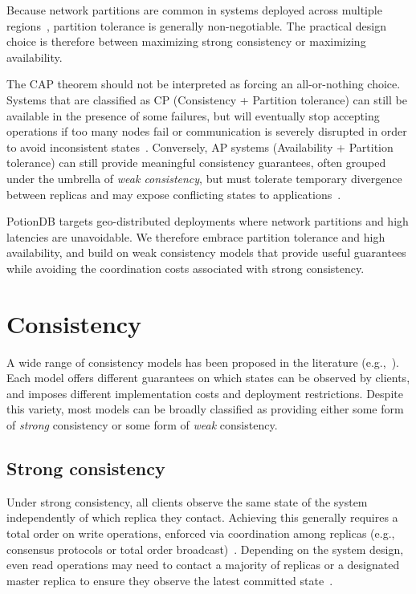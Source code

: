 Because network partitions are common in systems deployed across multiple
regions~\cite{bailis2013eventually}, partition tolerance is generally non-negotiable.
The practical design choice is therefore between maximizing strong consistency
or maximizing availability.

The CAP theorem should not be interpreted as forcing an all-or-nothing choice.
Systems that are classified as CP (Consistency + Partition tolerance) can still be
available in the presence of some failures, but will eventually stop accepting
operations if too many nodes fail or communication is severely disrupted in order
to avoid inconsistent states~\cite{bailis2013eventually}. Conversely, AP systems
(Availability + Partition tolerance) can still provide meaningful consistency
guarantees, often grouped under the umbrella of \emph{weak consistency}, but must
tolerate temporary divergence between replicas and may expose conflicting states
to applications~\cite{bailis2013eventually}.

PotionDB targets geo-distributed deployments where network partitions and high
latencies are unavoidable. We therefore embrace partition tolerance and high
availability, and build on weak consistency models that provide useful guarantees
while avoiding the coordination costs associated with strong consistency.

\section{Consistency}
\label{sec:consistency}

A wide range of consistency models has been proposed in the literature
(e.g.,~\cite{bernstein1987concurrency,linearizability,spanner,bailis2013eventually,occic2012causal,dynamo,session}).
Each model offers different guarantees on which states can be observed by clients,
and imposes different implementation costs and deployment restrictions. Despite
this variety, most models can be broadly classified as providing either some form
of \emph{strong} consistency or some form of \emph{weak} consistency.

\subsection{Strong consistency}
\label{sec:strong-consistency}

Under strong consistency, all clients observe the same state of the system
independently of which replica they contact. Achieving this generally requires a
total order on write operations, enforced via coordination among replicas
(e.g., consensus protocols or total order broadcast)~\cite{bernstein1987concurrency,linearizability,spanner,paxos,spanner}.
Depending on the system design, even read operations may need to contact a
majority of replicas or a designated master replica to ensure they observe the
latest committed state~\cite{spanner,si}.

